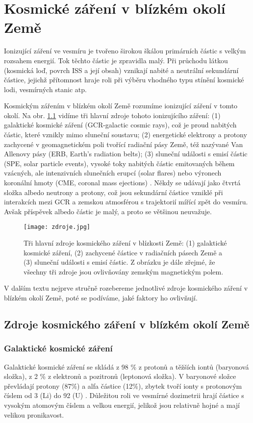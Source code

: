 \chapter{Kosmické záření v blízkém okolí Země}
Ionizující záření ve vesmíru je tvořeno širokou škálou primárních částic s velkým rozsahem energií. Tok těchto částic je zpravidla malý. Při průchodu látkou (kosmická loď, povrch ISS a její obsah) vznikají nabité a neutrální sekundární částice, jejichž přítomnost hraje roli při výběru vhodného typu stínění kosmické lodi, vesmírných stanic atp.   

Kosmickým zářením v blízkém okolí Země rozumíme ionizující záření v tomto okolí. Na obr. \ref{fig:zdroje} vidíme tři hlavní zdroje tohoto ionizujícího záření: (1) galaktické kosmické záření (GCR-galactic cosmic rays), což je proud nabitých částic, které vznikly mimo sluneční soustavu; (2) energetické elektrony a protony zachycené v geomagnetickém poli tvořící radiační pásy Země, též nazývané Van Allenovy pásy (ERB, Earth's radiation belts); (3) sluneční události s emisí částic (SPE, solar particle events), vysoké toky nabitých částic emitovaných během vzácných, ale intenzivních slunečních erupcí (solar flares) nebo výronech koronální hmoty (CME, coronal mass ejections) \cite{benton}. Někdy se udávají jako čtvrtá složka albedo neutrony a protony, což jsou sekundární částice
vzniklé při interakcích mezi GCR a zemskou atmosférou s trajektorií mířící zpět do vesmíru. Avšak příspěvek albedo částic je malý, a proto se většinou neuvažuje.

\begin{figure}[ht]
  \centering
  \texttt{[image: zdroje.jpg]}
  \caption{Tři hlavní zdroje kosmického záření v blízkosti Země: (1) galaktické kosmické záření, (2) zachycené částice v radiačních pásech Země a (3) sluneční události s emisí částic. Z obrázku je dále zřejmé, že všechny tři zdroje jsou ovlivňovány zemským magnetickým polem. \cite{benton}}
  \label{fig:zdroje}
\end{figure}

V dalším textu nejprve stručně rozebereme jednotlivé zdroje kosmického záření v blízkém okolí Země, poté se podíváme, jaké faktory ho ovlivňují.
\section{Zdroje kosmického záření v blízkém okolí Země}
\subsection{Galaktické kosmické záření}
Galaktické kosmické záření se skládá z 98 \% z protonů a těžších iontů (baryonová složka), z 2 \% z elektronů a pozitronů (leptonová složka). V baryonové složce převládají protony (87\%) a alfa částice (12\%), zbytek tvoří ionty s protonovým číslem od 3 (Li) do 92 (U) \cite{benton}. Důležitou roli ve vesmírné dozimetrii hrají částice s vysokým atomovým číslem a velkou energií, jelikož jsou relativně hojné a mají velikou pronikavost.

